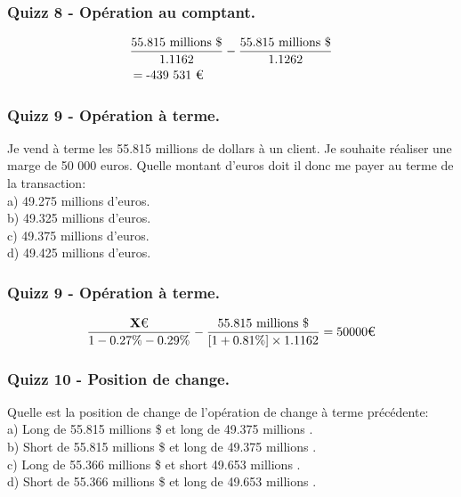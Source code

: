 \documentclass{beamer}
\begin{document}
\begin{frame}
\frametitle{Quizz 8 - Opération au comptant.}
\huge
\[
\begin{split}
&\frac{\text{55.815 millions \$}}{1.1162}-\frac{\text{55.815 millions \$}}{1.1262}\\
&=\text{-439 531 \texteuro}\\
\end{split}
\]
\end{frame}


\begin{frame}
\frametitle{Quizz 9 - Opération à terme.}
Je vend à terme les 55.815 millions de dollars à un client. Je souhaite réaliser une marge de 50 000 euros. Quelle montant d'euros doit il donc me payer au terme de la transaction:\\
\vspace{0.5cm}
a) 49.275 millions d'euros. \\
b) 49.325 millions d'euros. \\
c) 49.375 millions d'euros. \\
d) 49.425 millions d'euros.\\
\vspace{0.5cm}
\end{frame}


\begin{frame}
\frametitle{Quizz 9 - Opération à terme.}
\Large
\[
\frac{\textbf{X} \text{\texteuro}}{1-0.27\%-0.29\%}-\frac{55.815 \text{ millions } \$}{[1+0.81\%] \times 1.1162}=50 000 \text{\texteuro}
\]
\end{frame}

\begin{frame}
\frametitle{Quizz 10 - Position de change.}
Quelle est la position de change de l'opération de change à terme précédente:\\
\vspace{0.5cm}
a) Long de 55.815 millions \$ et long de 49.375 millions \texteuro. \\
b) Short de 55.815 millions \$  et long de 49.375 millions \texteuro.\\
c) Long de 55.366 millions \$ et short 49.653 millions \texteuro.\\
d) Short de 55.366 millions \$ et long de 49.653 millions \texteuro.\\
\vspace{0.5cm}
\end{frame}
\end{document}

